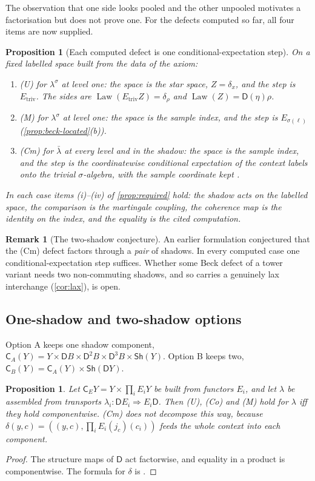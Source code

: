 \documentclass[11pt]{article}
\newtheorem{proposition}[theorem]{Proposition}
\theoremstyle{definition}
\newtheorem{remark}[theorem]{Remark}
\newcommand{\D}{\mathsf D}
\newcommand{\C}{\mathsf C}
\newcommand{\Sh}{\mathsf{Sh}}
\newcommand{\ls}{\lambda^{\sigma}}
\newcommand{\lb}{\bar\lambda}
\newcommand{\Law}{\operatorname{Law}}
\begin{document}
The observation that one side looks pooled and the other unpooled motivates a factorisation but does not prove one. For the defects
computed so far, all four items are now supplied.

\begin{proposition}[Each computed defect is one conditional-expectation step]\label{prop:single-step}
On a fixed labelled space built from the data of the axiom:
\begin{enumerate}[label=(\alph*)]
\item (U) for $\ls$ at level one: the space is the star space, $Z=\delta_x$, and the step is $E_{\mathrm{triv}}$. The sides are
  $\Law(E_{\mathrm{triv}}Z)=\delta_\rho$ and $\Law(Z)=\D(\eta)\rho$.
\item (M) for $\ls$ at level one: the space is the sample index, and the step is $E_{\sigma(\ell)}$ (\cref{prop:beck-located}(b)).
\item (Cm) for $\lb$ at every level and in the shadow: the space is the sample index, and the step is the coordinatewise conditional
  expectation of the context labels onto the trivial $\sigma$-algebra, with the sample coordinate kept \cite[Thm.~13.16]{Tower}.
\end{enumerate}
In each case items (i)--(iv) of \cref{prop:required} hold: the shadow acts on the labelled space, the comparison is the martingale
coupling, the coherence map is the identity on the index, and the equality is the cited computation.
\end{proposition}

\begin{remark}[The two-shadow conjecture]
An earlier formulation conjectured that the (Cm) defect factors through a \emph{pair} of shadows. In every computed case one
conditional-expectation step suffices. Whether some Beck defect of a tower variant needs two non-commuting shadows, and so carries a
genuinely lax interchange (\cref{cor:lax}), is open.
\end{remark}

\subsection{One-shadow and two-shadow options}
Option A keeps one shadow component, $\C_A(Y)=Y\times\D B\times\D^2B\times\D^3B\times\Sh(Y)$. Option B keeps two,
$\C_B(Y)=\C_A(Y)\times\Sh(\D Y)$.

\begin{proposition}\label{prop:options}
Let $\C_EY=Y\times\prod_iE_iY$ be built from functors $E_i$, and let $\lambda$ be assembled from transports
$\lambda_i\colon\D E_i\Rightarrow E_i\D$. Then (U), (Co) and (M) hold for $\lambda$ iff they hold componentwise. (Cm) does not
decompose this way, because $\delta(y,c)=((y,c),\prod_iE_i(j_c)(c_i))$ feeds the \emph{whole} context into each component.
\end{proposition}
\begin{proof}
The structure maps of $\D$ act factorwise, and equality in a product is componentwise. The formula for $\delta$ is
\cite[\S6]{Tower}.
\end{proof}
\end{document}
